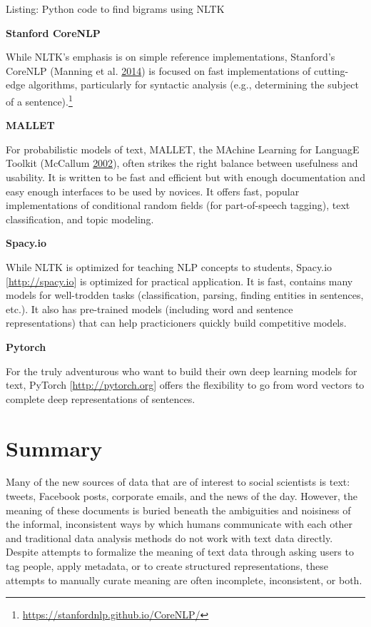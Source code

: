 \documentclass[]{krantz}
\begin{document}
Listing: Python code to find bigrams using NLTK

\textbf{Stanford CoreNLP}

While NLTK's emphasis is on simple reference implementations, Stanford's
CoreNLP (Manning et al.
\protect\hyperlink{ref-manning2014stanford}{2014}) is focused on fast
implementations of cutting-edge algorithms, particularly for syntactic
analysis (e.g., determining the subject of a sentence).\footnote{\url{https://stanfordnlp.github.io/CoreNLP/}}

\textbf{MALLET}

For probabilistic models of text, MALLET, the MAchine Learning for
LanguagE Toolkit (McCallum \protect\hyperlink{ref-mallet}{2002}), often
strikes the right balance between usefulness and usability. It is
written to be fast and efficient but with enough documentation and easy
enough interfaces to be used by novices. It offers fast, popular
implementations of conditional random fields (for part-of-speech
tagging), text classification, and topic modeling.

\textbf{Spacy.io}

While NLTK is optimized for teaching NLP concepts to students, Spacy.io
{[}\url{http://spacy.io}{]} is optimized for practical application. It
is fast, contains many models for well-trodden tasks (classification,
parsing, finding entities in sentences, etc.). It also has pre-trained
models (including word and sentence representations) that can help
practicioners quickly build competitive models.

\textbf{Pytorch}

For the truly adventurous who want to build their own deep learning
models for text, PyTorch {[}\url{http://pytorch.org}{]} offers the
flexibility to go from word vectors to complete deep representations of
sentences.

\section{Summary}\label{summary-5}

Many of the new sources of data that are of interest to social
scientists is text: tweets, Facebook posts, corporate emails, and the
news of the day. However, the meaning of these documents is buried
beneath the ambiguities and noisiness of the informal, inconsistent ways
by which humans communicate with each other and traditional data
analysis methods do not work with text data directly. Despite attempts
to formalize the meaning of text data through asking users to tag
people, apply metadata, or to create structured representations, these
attempts to manually curate meaning are often incomplete, inconsistent,
or both.
\end{document}
